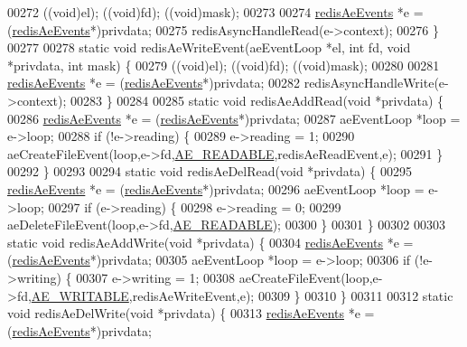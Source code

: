 \begin{DoxyCode}
00272     ((\textcolor{keywordtype}{void})el); ((\textcolor{keywordtype}{void})fd); ((\textcolor{keywordtype}{void})mask);
00273 
00274     \hyperlink{structredisAeEvents}{redisAeEvents} *e = (\hyperlink{structredisAeEvents}{redisAeEvents}*)privdata;
00275     redisAsyncHandleRead(e->context);
00276 \}
00277 
00278 \textcolor{keyword}{static} \textcolor{keywordtype}{void} redisAeWriteEvent(aeEventLoop *el, \textcolor{keywordtype}{int} fd, \textcolor{keywordtype}{void} *privdata, \textcolor{keywordtype}{int} mask) \{
00279     ((\textcolor{keywordtype}{void})el); ((\textcolor{keywordtype}{void})fd); ((\textcolor{keywordtype}{void})mask);
00280 
00281     \hyperlink{structredisAeEvents}{redisAeEvents} *e = (\hyperlink{structredisAeEvents}{redisAeEvents}*)privdata;
00282     redisAsyncHandleWrite(e->context);
00283 \}
00284 
00285 \textcolor{keyword}{static} \textcolor{keywordtype}{void} redisAeAddRead(\textcolor{keywordtype}{void} *privdata) \{
00286     \hyperlink{structredisAeEvents}{redisAeEvents} *e = (\hyperlink{structredisAeEvents}{redisAeEvents}*)privdata;
00287     aeEventLoop *loop = e->loop;
00288     \textcolor{keywordflow}{if} (!e->reading) \{
00289         e->reading = 1;
00290         aeCreateFileEvent(loop,e->fd,\hyperlink{ae_8h_a7a9a2162d007d09739955b4e55c65bf3}{AE\_READABLE},redisAeReadEvent,e);
00291     \}
00292 \}
00293 
00294 \textcolor{keyword}{static} \textcolor{keywordtype}{void} redisAeDelRead(\textcolor{keywordtype}{void} *privdata) \{
00295     \hyperlink{structredisAeEvents}{redisAeEvents} *e = (\hyperlink{structredisAeEvents}{redisAeEvents}*)privdata;
00296     aeEventLoop *loop = e->loop;
00297     \textcolor{keywordflow}{if} (e->reading) \{
00298         e->reading = 0;
00299         aeDeleteFileEvent(loop,e->fd,\hyperlink{ae_8h_a7a9a2162d007d09739955b4e55c65bf3}{AE\_READABLE});
00300     \}
00301 \}
00302 
00303 \textcolor{keyword}{static} \textcolor{keywordtype}{void} redisAeAddWrite(\textcolor{keywordtype}{void} *privdata) \{
00304     \hyperlink{structredisAeEvents}{redisAeEvents} *e = (\hyperlink{structredisAeEvents}{redisAeEvents}*)privdata;
00305     aeEventLoop *loop = e->loop;
00306     \textcolor{keywordflow}{if} (!e->writing) \{
00307         e->writing = 1;
00308         aeCreateFileEvent(loop,e->fd,\hyperlink{ae_8h_ab6bfb0366ccb6277112d132c2a2bf500}{AE\_WRITABLE},redisAeWriteEvent,e);
00309     \}
00310 \}
00311 
00312 \textcolor{keyword}{static} \textcolor{keywordtype}{void} redisAeDelWrite(\textcolor{keywordtype}{void} *privdata) \{
00313     \hyperlink{structredisAeEvents}{redisAeEvents} *e = (\hyperlink{structredisAeEvents}{redisAeEvents}*)privdata;

\end{DoxyCode}
